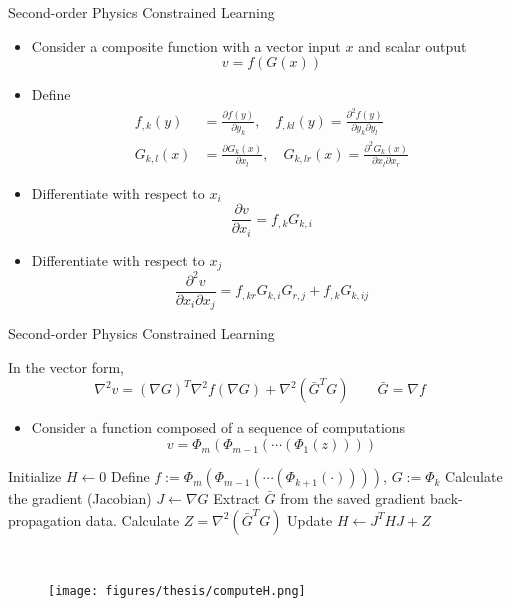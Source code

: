 \documentclass[usenames,dvipsnames]{beamer}
\begin{document}
\begin{frame}{Second-order Physics Constrained Learning}
	\begin{itemize}
\item Consider a composite function with a vector input $x$ and scalar output 
\begin{equation}\label{equ:t1}
	v = f(G(x))
\end{equation}
\item Define 
{\small
\begin{align*}
	f_{,k}(y) &= \frac{\partial f(y)}{\partial y_k}, \quad f_{,kl}(y) = \frac{\partial^2 f(y)}{\partial y_k \partial y_l} \\ 
	G_{k,l}(x) &=\frac{\partial G_k(x)}{\partial x_l},\quad G_{k, lr}(x) = \frac{\partial^2 G_k(x)}{\partial x_l\partial x_r}
\end{align*}
}
\item Differentiate  with respect to $x_i$
\begin{equation}\label{equ:t2}
\frac{\partial v}{\partial x_i} = f_{,k}G_{k,i}
\end{equation}
\item Differentiate  with respect to $x_j$
$$\boxed{\frac{\partial^2 v}{\partial x_i \partial x_j} = f_{,kr} G_{k,i} G_{r,j} + f_{,k} G_{k,ij}}$$
	\end{itemize}

\end{frame}


\begin{frame}{Second-order Physics Constrained Learning}


In the vector form,
$$\boxed{\nabla^2 v = (\nabla G)^T \nabla^2 f (\nabla G) + \nabla^2 (\bar G^T G)\qquad \bar G = \nabla f}$$

\begin{itemize}
\item Consider a function composed of a  sequence of computations
$$v = \Phi_m(\Phi_{m-1}(\cdots (\Phi_1(z))))$$
\end{itemize}


\begin{minipage}{0.7\textwidth}
	\small
\begin{algorithmic}[1]
	\State Initialize $H \gets 0$
	\State Define $f:= \Phi_m (\Phi_{m-1} (\cdots (\Phi_{k+1}(\cdot))))$, $G:= \Phi_k$
	\State Calculate the gradient (Jacobian) $J \gets \nabla G$
	\State Extract $\bar G$ from the saved gradient back-propagation data. 
	\State Calculate $Z = \nabla^2(\bar G^T G)$ \label{algo:second-order-algo-update-line}
	\State Update $H \gets J^THJ + Z$
	\EndFor
\end{algorithmic}
\end{minipage}~
\begin{minipage}{0.3\textwidth}
\begin{figure}
	\centering
	\texttt{[image: figures/thesis/computeH.png]}
\end{figure}
\end{minipage}


\end{frame}
\end{document}
